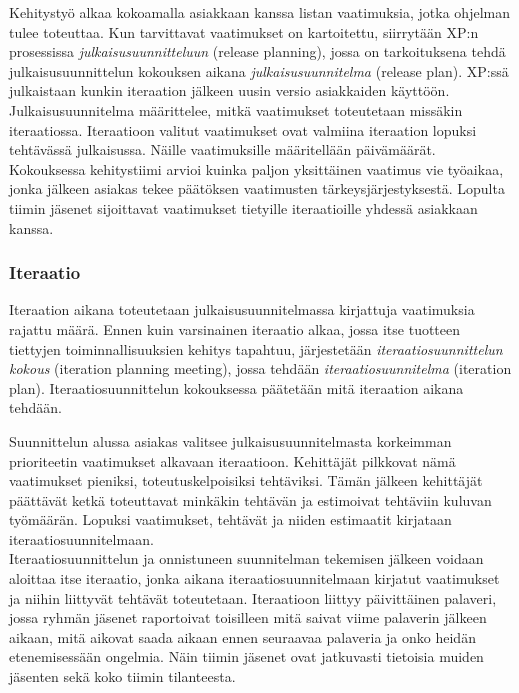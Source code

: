 \documentclass[finnish]{../tktltiki2}
\theoremstyle{definition}
\theoremstyle{remark}
\begin{document}
Kehitystyö alkaa kokoamalla asiakkaan kanssa listan vaatimuksia, jotka ohjelman tulee toteuttaa. Kun tarvittavat vaatimukset on kartoitettu, siirrytään XP:n prosessissa \emph{julkaisusuunnitteluun} (release planning),
jossa on tarkoituksena tehdä julkaisusuunnittelun kokouksen aikana \emph{julkaisusuunnitelma} (release plan). XP:ssä julkaistaan kunkin iteraation jälkeen uusin versio asiakkaiden käyttöön. Julkaisusuunnitelma määrittelee, mitkä vaatimukset toteutetaan missäkin iteraatiossa. Iteraatioon valitut vaatimukset ovat valmiina iteraation lopuksi tehtävässä julkaisussa. Näille vaatimuksille määritellään päivämäärät.\\

Kokouksessa kehitystiimi arvioi kuinka paljon yksittäinen vaatimus vie työaikaa, jonka jälkeen asiakas
tekee päätöksen vaatimusten tärkeysjärjestyk\-sestä. Lopulta tiimin jäsenet sijoittavat vaatimukset tietyille iteraatioille yhdessä asiakkaan kanssa.

\subsubsection{Iteraatio}

Iteraation aikana toteutetaan julkaisusuunnitelmassa kirjattuja vaatimuksia rajattu määrä.
Ennen kuin varsinainen iteraatio alkaa, jossa itse tuotteen tiettyjen toiminnallisuuksien
kehitys tapahtuu, järjestetään \emph{iteraatiosuunnittelun kokous} (iteration planning meeting), jossa tehdään \emph{iteraatiosuunnitelma} (iteration plan). Iteraatiosuunnittelun kokouksessa päätetään mitä iteraation aikana tehdään.

Suunnittelun alussa asiakas valitsee julkaisusuunnitelmasta korkeimman prioriteetin vaatimukset alkavaan iteraatioon. Kehittäjät pilkkovat nämä vaatimukset pieniksi, toteutuskelpoisiksi tehtäviksi. Tämän jälkeen kehittäjät päättävät ketkä toteuttavat minkäkin tehtävän ja estimoivat tehtäviin kuluvan työmäärän. Lopuksi vaatimukset, tehtävät ja niiden estimaatit kirjataan iteraatiosuunnitelmaan.\\

Iteraatiosuunnittelun ja onnistuneen suunnitelman tekemisen jälkeen voidaan aloittaa itse iteraatio, jonka aikana iteraatiosuunnitelmaan kirjatut vaatimukset ja niihin liittyvät tehtävät toteutetaan. Iteraatioon liittyy päivittäinen palaveri, jossa ryhmän jäsenet raportoivat toisilleen mitä saivat viime palaverin jälkeen aikaan, mitä aikovat saada aikaan ennen seuraavaa palaveria ja onko heidän etenemisessään ongelmia. Näin tiimin jäsenet ovat jatkuvasti tietoisia
muiden jäsenten sekä koko tiimin tilanteesta.\\
\end{document}
